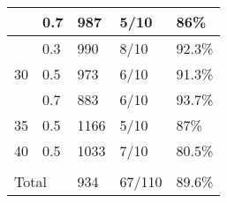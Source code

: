 \begin{table}[h]
\begin{tabular}{lllll}
\multicolumn{1}{|l|}{}                    & \multicolumn{1}{l|}{0.7}    & \multicolumn{1}{l|}{987}                                                          & \multicolumn{1}{l|}{5/10}                                                       & \multicolumn{1}{l|}{86\%}                                                                              \\ \hline
\multicolumn{1}{|l|}{\multirow{3}{*}{30}} & \multicolumn{1}{l|}{0.3}    & \multicolumn{1}{l|}{990}                                                          & \multicolumn{1}{l|}{8/10}                                                       & \multicolumn{1}{l|}{92.3\%}                                                                            \\ \cline{2-5}
\multicolumn{1}{|l|}{}                    & \multicolumn{1}{l|}{0.5}    & \multicolumn{1}{l|}{973}                                                          & \multicolumn{1}{l|}{6/10}                                                       & \multicolumn{1}{l|}{91.3\%}                                                                            \\ \cline{2-5}
\multicolumn{1}{|l|}{}                    & \multicolumn{1}{l|}{0.7}    & \multicolumn{1}{l|}{883}                                                          & \multicolumn{1}{l|}{6/10}                                                       & \multicolumn{1}{l|}{93.7\%}                                                                            \\ \hline
\multicolumn{1}{|l|}{35}                  & \multicolumn{1}{l|}{0.5}    & \multicolumn{1}{l|}{1166}                                                         & \multicolumn{1}{l|}{5/10}                                                       & \multicolumn{1}{l|}{87\%}                                                                              \\ \hline
\multicolumn{1}{|l|}{40}                  & \multicolumn{1}{l|}{0.5}    & \multicolumn{1}{l|}{1033}                                                         & \multicolumn{1}{l|}{7/10}                                                       & \multicolumn{1}{l|}{80.5\%}                                                                            \\ \hline
                                          &                             &                                                                                   &                                                                                 &                                                                                                        \\ \hline
\multicolumn{2}{|l|}{Total}                                             & \multicolumn{1}{l|}{934}                                                          & \multicolumn{1}{l|}{67/110}                                                     & \multicolumn{1}{l|}{89.6\%}                                                                            \\ \hline
\end{tabular}
\end{table}
